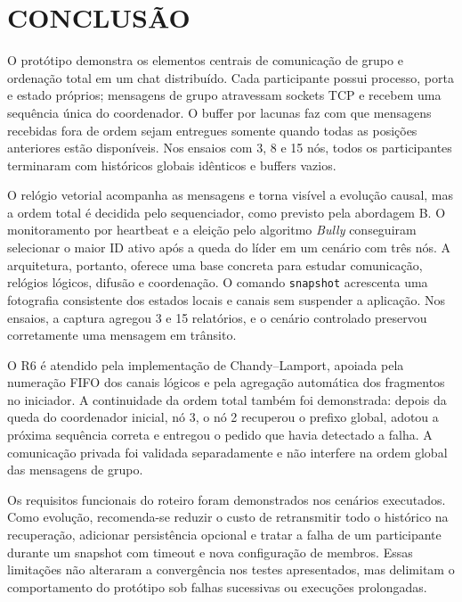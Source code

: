 \chapter{CONCLUSÃO}\label{chap:conclusao}

O protótipo demonstra os elementos centrais de comunicação de grupo e ordenação
total em um chat distribuído. Cada participante possui processo, porta e estado
próprios; mensagens de grupo atravessam sockets TCP e recebem uma sequência única
do coordenador. O buffer por lacunas faz com que mensagens recebidas fora de ordem
sejam entregues somente quando todas as posições anteriores estão disponíveis.
Nos ensaios com 3, 8 e 15 nós, todos os participantes terminaram com históricos
globais idênticos e buffers vazios.

O relógio vetorial acompanha as mensagens e torna visível a evolução causal, mas
a ordem total é decidida pelo sequenciador, como previsto pela abordagem B. O
monitoramento por heartbeat e a eleição pelo algoritmo \textit{Bully} conseguiram selecionar o maior
ID ativo após a queda do líder em um cenário com três nós. A arquitetura, portanto,
oferece uma base concreta para estudar comunicação, relógios lógicos, difusão e
coordenação. O comando \texttt{snapshot} acrescenta uma fotografia consistente dos
estados locais e canais sem suspender a aplicação. Nos ensaios, a captura agregou
3 e 15 relatórios, e o cenário controlado preservou corretamente uma mensagem em
trânsito.

O R6 é atendido pela implementação de Chandy--Lamport, apoiada pela numeração FIFO
dos canais lógicos e pela agregação automática dos fragmentos no iniciador. A
continuidade da ordem total também foi demonstrada: depois da queda do coordenador
inicial, nó 3, o nó 2 recuperou o prefixo global, adotou a próxima sequência
correta e entregou o pedido que havia detectado a falha. A comunicação privada foi
validada separadamente e não interfere na ordem global das mensagens de grupo.

Os requisitos funcionais do roteiro foram demonstrados nos cenários executados.
Como evolução, recomenda-se reduzir o custo de retransmitir todo o histórico na
recuperação, adicionar persistência opcional e tratar a falha de um participante
durante um snapshot com timeout e nova configuração de membros. Essas limitações
não alteraram a convergência nos testes apresentados, mas delimitam o comportamento
do protótipo sob falhas sucessivas ou execuções prolongadas.

